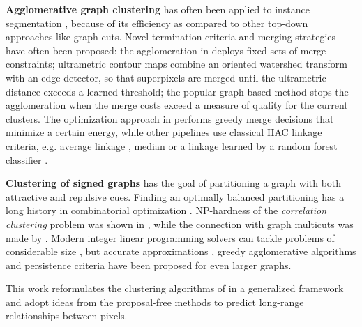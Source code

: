 \textbf{Agglomerative graph clustering} has often been applied to instance segmentation \cite{ren2013image,liu2016image,salembier2000binary}, because of its efficiency as compared to other top-down approaches like graph cuts. 
Novel termination criteria and merging strategies have often been proposed: the agglomeration in \cite{malmberg2011generalized} deploys fixed sets of merge constraints; ultrametric contour maps \cite{arbelaez2011contour} combine an oriented watershed transform with an edge detector, so that superpixels are merged until the ultrametric distance exceeds a learned threshold; the popular graph-based method \cite{felzenszwalb2004efficient} stops the agglomeration when the merge costs exceed a measure of quality for the current clusters. 
The optimization approach in \cite{kiran2014global} performs greedy merge decisions that minimize a certain energy, while other pipelines use classical HAC linkage criteria, e.g. average linkage \cite{liu2018affinity,lee2017superhuman}, median \cite{funke2018large} or a linkage learned by a random forest classifier \cite{nunez2013machine,knowles2016rhoananet}.

\textbf{Clustering of signed graphs} has the goal of partitioning a graph with both attractive and repulsive cues. Finding an optimally balanced partitioning has a long history in combinatorial optimization \cite{grotschel1989cutting,grotschel1990facets,chopra1993partition}. %
NP-hardness of the \emph{correlation clustering} problem was shown in \cite{bansal2004correlation}, while the connection with graph multicuts was made by \cite{demaine2006correlation}. Modern integer linear programming solvers can tackle problems of considerable size \cite{andres2012globally}, but accurate approximations \cite{pape2017solving,beier2016efficient,yarkony2012fast}, greedy agglomerative algorithms \cite{levinkov2017comparative,wolf2019mutex,keuper2015efficient,kardoostsolving} and persistence criteria \cite{lange2018partial,lange2018combinatorial} have been proposed for even larger graphs.

This work reformulates the clustering algorithms of \cite{levinkov2017comparative,wolf2018mutex,keuper2015efficient} in a generalized framework and adopt ideas from the proposal-free methods \cite{liu2018affinity,wolf2018mutex,lee2017superhuman} to predict long-range relationships between pixels.
